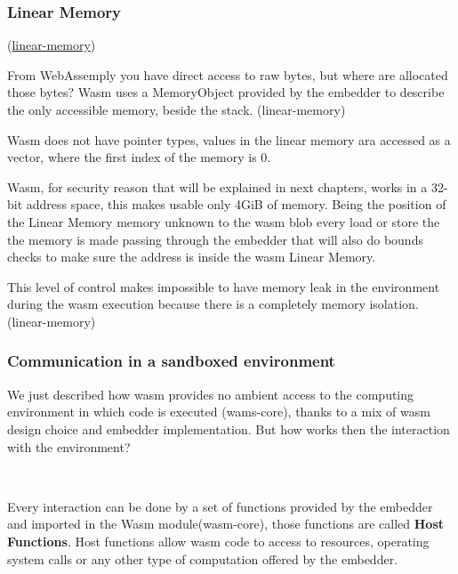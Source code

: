 \documentclass[../main.tex]{subfiles}
\begin{document}
\subsubsection{Linear Memory}
(\href{https://hacks.mozilla.org/2017/07/memory-in-webassembly-and-why-its-safer-than-you-think/}{linear-memory})

From WebAssemply you have direct access to raw bytes, but where are allocated those bytes? Wasm uses a MemoryObject provided by the embedder to describe the only accessible memory, beside the stack. (linear-memory)

Wasm does not have pointer types, values in the linear memory ara accessed as a vector, where the first index of the memory is 0.

Wasm, for security reason that will be explained in next chapters, works in a 32-bit address space, this makes usable only 4GiB of memory. Being the position of the Linear Memory memory unknown to the wasm blob every load or store the the memory is made passing through the embedder that will also do bounds checks to make sure the address is inside the wasm Linear Memory.

This level of control makes impossible to have memory leak in the environment during the wasm execution because there is a completely memory isolation. (linear-memory)

%
%
%
%

\subsubsection{Communication in a sandboxed environment}

We just described how wasm provides no ambient access to the computing environment in which code is executed (wams-core), thanks to a mix of wasm design choice and embedder implementation. But how works then the interaction with the environment?

\

Every interaction can be done by a set of functions provided by the embedder and imported in the Wasm module(wasm-core), those functions are called \textbf{Host Functions}. Host functions allow wasm code to access to resources, operating system calls or any other type of computation offered by the embedder.
\end{document}
